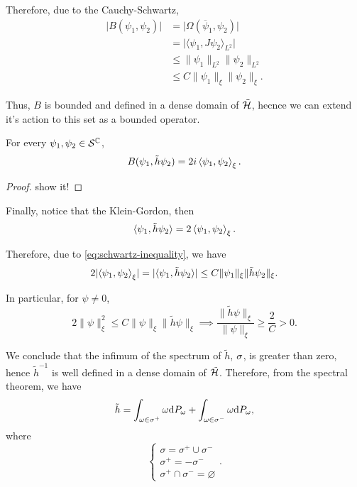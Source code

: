 Therefore, due to the Cauchy-Schwartz,
\begin{subequations}\label{eq:schwartz-inequality}
    \begin{align}
        \lvert B(\psi_1,\psi_2)\rvert&=\lvert\Omega\left(\overline{\psi}_1,\psi_2\right)\rvert\\
        &=\lvert\langle\psi_1,J\psi_2\rangle_{L^2}\rvert\\
        &\leq\lVert\psi_1\rVert_{L^2}\lVert\psi_2\rVert_{L^2}\\
        &\leq C\lVert\psi_1\rVert_\xi\lVert\psi_2\rVert_\xi.
    \end{align}
\end{subequations}

Thus, \(B\) is bounded and defined in a dense domain of \(\tilde{{\mathcal{H}}}\), hecnce we can extend it's action to this set as a bounded operator.
\begin{proposition}
    For every \(\psi_1,\psi_2\in{\mathcal{S}}^{\mathbb{C}}\),
    \begin{equation}
        B(\psi_1,\tilde{h}\psi_2)=2i\left\langle \psi_1,\psi_2\right\rangle_{\xi}.
    \end{equation}
\end{proposition}
\begin{proof}
    show it!
\end{proof}

Finally, notice that the Klein-Gordon, then
\begin{equation}
    \langle\psi_1,\tilde{h}\psi_2\rangle=2\left\langle \psi_1,\psi_2\right\rangle_{\xi}.
\end{equation}

Therefore, due to \cref{eq:schwartz-inequality}, we have
\begin{equation}
    2\lvert\left\langle \psi_1,\psi_2\right\rangle_{\xi}\rvert=\lvert\langle\psi_1,\tilde{h}\psi_2\rangle\rvert\leq C\lVert\psi_1\rVert_\xi\lVert\tilde{h}\psi_2\rVert_\xi.
\end{equation}

In particular, for \(\psi\neq 0\),
\begin{equation}
    2\lVert\psi\rVert^2_{\xi}\leq C\lVert\psi\rVert_\xi\lVert\tilde{h}\psi\rVert_\xi\implies \frac{\lVert\tilde{h}\psi\rVert_\xi}{\lVert\psi\rVert_\xi}\geq\frac{2}{C}>0.
\end{equation}

We conclude that the infimum of the spectrum of \(\tilde{h}\), \(\sigma\), is greater than zero, hence \(\tilde{h}^{-1}\) is well defined in a dense domain of \(\tilde{{\mathcal{H}}}\). Therefore, from the spectral theorem, we have
\begin{equation}
    \tilde{h}=\int_{\omega\in\sigma^+}\omega\mathrm{d} P_\omega+\int_{\omega\in\sigma^-}\omega\mathrm{d} P_\omega,
\end{equation}
where
\begin{equation}
    \begin{cases}
        \sigma=\sigma^+\cup\sigma^-\\
        \sigma^+=-\sigma^-\\
        \sigma^+\cap\sigma^-=\varnothing
    \end{cases}.
\end{equation}

